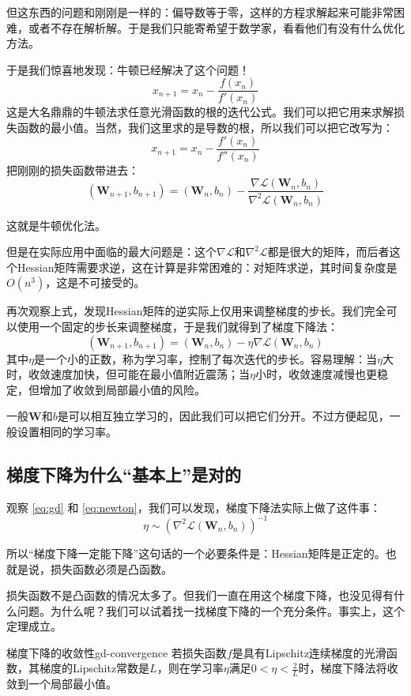 但这东西的问题和刚刚是一样的：偏导数等于零，这样的方程求解起来可能非常困难，或者不存在解析解。于是我们只能寄希望于数学家，看看他们有没有什么优化方法。

于是我们惊喜地发现：牛顿已经解决了这个问题！
\[ x_{n+1} = x_n - \frac{f(x_n)}{f'(x_n)} \]
这是大名鼎鼎的牛顿法求任意光滑函数的根的迭代公式。我们可以把它用来求解损失函数的最小值。当然，我们这里求的是导数的根，所以我们可以把它改写为：
\[ x_{n+1} = x_n - \frac{f'(x_n)}{f''(x_n)} \]
把刚刚的损失函数带进去：
\begin{equation}\label{eq:newton}
    (\mathbf{W}_{n+1}, b_{n+1}) = (\mathbf{W}_n, b_n) - \frac{\nabla \mathcal{L}(\mathbf{W}_n, b_n)}{\nabla^2 \mathcal{L}(\mathbf{W}_n, b_n)}
\end{equation}

这就是牛顿优化法。

但是在实际应用中面临的最大问题是：这个$\nabla \mathcal{L}$和$\nabla^2 \mathcal{L}$都是很大的矩阵，而后者这个Hessian矩阵需要求逆，这在计算是非常困难的：对矩阵求逆，其时间复杂度是$O(n^3)$，这是不可接受的。

再次观察上式，发现Hessian矩阵的逆实际上仅用来调整梯度的步长。我们完全可以使用一个固定的步长来调整梯度，于是我们就得到了梯度下降法：
\begin{equation}\label{eq:gd}
    (\mathbf{W}_{n+1}, b_{n+1}) = (\mathbf{W}_n, b_n) - \eta \nabla \mathcal{L}(\mathbf{W}_n, b_n)
\end{equation}
其中$\eta$是一个小的正数，称为学习率，控制了每次迭代的步长。容易理解：当$\eta$大时，收敛速度加快，但可能在最小值附近震荡；当$\eta$小时，收敛速度减慢也更稳定，但增加了收敛到局部最小值的风险。

一般$\mathbf{W}$和$b$是可以相互独立学习的，因此我们可以把它们分开。不过方便起见，一般设置相同的学习率。

\subsection{梯度下降为什么“基本上”是对的}

观察 \eqref{eq:gd} 和 \eqref{eq:newton}，我们可以发现，梯度下降法实际上做了这件事：
\[ \eta \sim (\nabla^2 \mathcal{L}(\mathbf{W}_n, b_n))^{-1} \]

所以“梯度下降一定能下降”这句话的一个必要条件是：Hessian矩阵是正定的。也就是说，损失函数必须是凸函数。

损失函数不是凸函数的情况太多了。但我们一直在用这个梯度下降，也没见得有什么问题。为什么呢？我们可以试着找一找梯度下降的一个充分条件。事实上，这个定理成立。
\begin{theorem}{梯度下降的收敛性}{gd-convergence}
    若损失函数$f$是具有Lipschitz连续梯度的光滑函数，其梯度的Lipschitz常数是$L$，则在学习率$\eta$满足$0 < \eta < \frac{2}{L}$时，梯度下降法将收敛到一个局部最小值。
\end{theorem}

